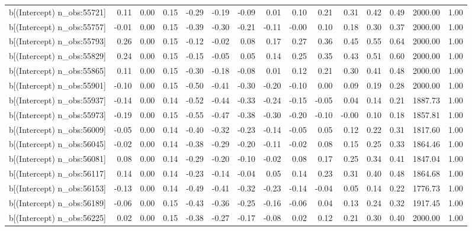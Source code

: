 \begin{table}[ht]
\begin{tabular}{rrrrrrrrrrrrrrr}
  b[(Intercept) n\_obs:55721] & 0.11 & 0.00 & 0.15 & -0.29 & -0.19 & -0.09 & 0.01 & 0.10 & 0.21 & 0.31 & 0.42 & 0.49 & 2000.00 & 1.00 \\ 
  b[(Intercept) n\_obs:55757] & -0.01 & 0.00 & 0.15 & -0.39 & -0.30 & -0.21 & -0.11 & -0.00 & 0.10 & 0.18 & 0.30 & 0.37 & 2000.00 & 1.00 \\ 
  b[(Intercept) n\_obs:55793] & 0.26 & 0.00 & 0.15 & -0.12 & -0.02 & 0.08 & 0.17 & 0.27 & 0.36 & 0.45 & 0.55 & 0.64 & 2000.00 & 1.00 \\ 
  b[(Intercept) n\_obs:55829] & 0.24 & 0.00 & 0.15 & -0.15 & -0.05 & 0.05 & 0.14 & 0.25 & 0.35 & 0.43 & 0.51 & 0.60 & 2000.00 & 1.00 \\ 
  b[(Intercept) n\_obs:55865] & 0.11 & 0.00 & 0.15 & -0.30 & -0.18 & -0.08 & 0.01 & 0.12 & 0.21 & 0.30 & 0.41 & 0.48 & 2000.00 & 1.00 \\ 
  b[(Intercept) n\_obs:55901] & -0.10 & 0.00 & 0.15 & -0.50 & -0.41 & -0.30 & -0.20 & -0.10 & 0.00 & 0.09 & 0.19 & 0.28 & 2000.00 & 1.00 \\ 
  b[(Intercept) n\_obs:55937] & -0.14 & 0.00 & 0.14 & -0.52 & -0.44 & -0.33 & -0.24 & -0.15 & -0.05 & 0.04 & 0.14 & 0.21 & 1887.73 & 1.00 \\ 
  b[(Intercept) n\_obs:55973] & -0.19 & 0.00 & 0.15 & -0.55 & -0.47 & -0.38 & -0.30 & -0.20 & -0.10 & -0.00 & 0.10 & 0.18 & 1857.81 & 1.00 \\ 
  b[(Intercept) n\_obs:56009] & -0.05 & 0.00 & 0.14 & -0.40 & -0.32 & -0.23 & -0.14 & -0.05 & 0.05 & 0.12 & 0.22 & 0.31 & 1817.60 & 1.00 \\ 
  b[(Intercept) n\_obs:56045] & -0.02 & 0.00 & 0.14 & -0.38 & -0.29 & -0.20 & -0.11 & -0.02 & 0.08 & 0.15 & 0.25 & 0.33 & 1864.46 & 1.00 \\ 
  b[(Intercept) n\_obs:56081] & 0.08 & 0.00 & 0.14 & -0.29 & -0.20 & -0.10 & -0.02 & 0.08 & 0.17 & 0.25 & 0.34 & 0.41 & 1847.04 & 1.00 \\ 
  b[(Intercept) n\_obs:56117] & 0.14 & 0.00 & 0.14 & -0.23 & -0.14 & -0.04 & 0.05 & 0.14 & 0.23 & 0.31 & 0.40 & 0.48 & 1864.68 & 1.00 \\ 
  b[(Intercept) n\_obs:56153] & -0.13 & 0.00 & 0.14 & -0.49 & -0.41 & -0.32 & -0.23 & -0.14 & -0.04 & 0.05 & 0.14 & 0.22 & 1776.73 & 1.00 \\ 
  b[(Intercept) n\_obs:56189] & -0.06 & 0.00 & 0.15 & -0.43 & -0.36 & -0.25 & -0.16 & -0.06 & 0.04 & 0.13 & 0.24 & 0.32 & 1917.45 & 1.00 \\ 
  b[(Intercept) n\_obs:56225] & 0.02 & 0.00 & 0.15 & -0.38 & -0.27 & -0.17 & -0.08 & 0.02 & 0.12 & 0.21 & 0.30 & 0.40 & 2000.00 & 1.00 \\ 

\end{tabular}
\end{table}
